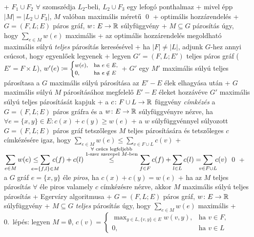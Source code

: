   + $F_1 \cup F_2$ $\forall$ szomszédja $L_2$-beli, $L_2 \cup F_3$ egy lefogó ponthalmaz
  + mivel épp $\lvert M \rvert = \lvert L_2 \cup F_3 \rvert$, $M$
    valóban maximális méretű \qed
+ \prob optimális hozzárendelés
  + \DataIn $G = (F, L; E)$ páros gráf, $w\colon E \to \mathbb{R}$
    súlyfüggvény
  + \DataOut $M \subseteq G$ párosítás úgy, hogy $\sum_{e \in M} w(e)$
    maximális
  + az optimális hozzárendelés megoldható maximális súlyú
    \emph{teljes} párosítás keresésével
    + ha $\lvert F \rvert \ne \lvert L \rvert$, adjunk $G$-hez annyi
      csúcsot, hogy egyenlőek legyenek
    + legyen $G' = (F, L; E')$ teljes páros gráf ($E' = F
      \times L$), $w'(e) \coloneqq \text{\footnotesize$\begin{cases}
        w(e), &\text{ha $e \in E$,} \\
        0, & \text{ha $e \notin E$}
      \end{cases}$}$
    + $G'$ egy $M'$ maximális súlyú teljes párosítasa a $G$ maximális
      súlyú párosítása az $E' - E$ élek elhagyása után
    + $G$ maximális súlyú $M$ párosításához megfelelő $E' - E$ éleket
      hozzávéve $G'$ maximális súlyú teljes párosítását kapjuk
+ \dfn a $c\colon F \cup L \to \mathbb{R}$ függvény \emph{címkézés} a $G =
  (F, L; E)$ páros gráfra és a $w\colon E \to \mathbb{R}$ súlyfüggvényre
  nézve, ha $\forall e = \{ x, y \} \in E\colon c(x) + c(y) \ge w(e)$
+ \lemma a $w$ súlyfüggvénnyel súlyozott $G = (F, L; E)$ páros gráf
  tetszőleges $M$ teljes párosítására és tetszőleges $c$
  címkézésére igaz, hogy $\sum_{e \in M} w(e) \le \sum_{v \in F
    \cup L} c(v)$
  + \proof $\displaystyle \sum_{e \in M} w(e) \le \sum_{\mathclap{e = \{f, l\} \in M}}\, c(f) +
    c(l) \overset{\substack{\text{$\forall$ csúcs legfeljebb}\\\text{$1$-szer szerepel $M$-ben}}}{\le} \sum_{f \in F} c(f) + \sum_{l \in L} c(l) = \sum_{\mathclap{v \in F
    \cup L}}\, c(v)$ \qed
  + \dfn a $G$ gráf $e = \{x, y\}$ éle \emph{piros}, ha $c(x) +
    c(y) = w(e)$
  + \corr ha az $M$ teljes párosítás $\forall$ éle piros valamely $c$
    címkézésre nézve, akkor $M$ maximális súlyú teljes párosítás
+ \alg Egerváry algoritmusa
  + \DataIn $G = (F, L; E)$ páros gráf, $w\colon E \to \mathbb{R}$
  súlyfüggvény
  + \DataOut $M \subseteq G$ \emph{teljes} párosítás úgy, hogy $\sum_{e \in M} w(e)$ maximális
  + 0.~lépés: legyen $M = \emptyset$, $c(v) = \begin{cases}
    \max_{y \in L, \{v, y\} \in E} w({v, y}), & \text{ha $v \in F$,} \\
    0, & \text{ha $v \in L$}
  \end{cases}$
